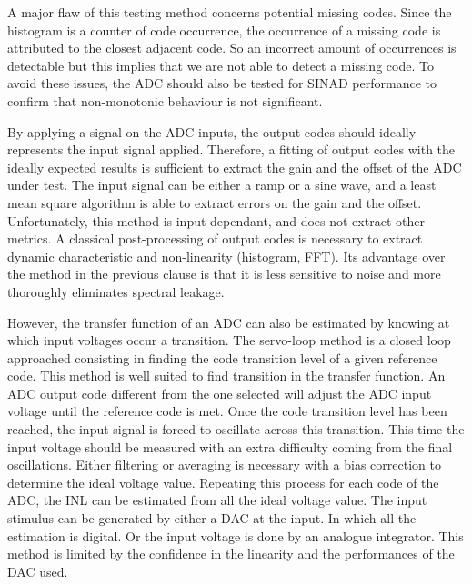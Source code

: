 A major flaw of this testing method concerns potential missing codes. Since the histogram is a counter of code occurrence, the occurrence of a missing code is attributed to the closest adjacent code. So an incorrect amount of occurrences is detectable but this implies that we are not able to detect a missing code. To avoid these issues, the ADC should also be tested for SINAD performance to confirm that non-monotonic behaviour is not significant.

By applying a signal on the ADC inputs, the output codes should ideally represents the input signal applied. Therefore, a fitting of output codes with the ideally expected results is sufficient to extract the gain and the offset of the ADC under test. The input signal can be either a ramp or a sine wave, and a least mean square algorithm is able to extract errors on the gain and the offset.
Unfortunately, this method is input dependant, and does not extract other metrics. A classical post-processing of output codes is necessary to extract dynamic characteristic and non-linearity (histogram, FFT). Its advantage over the method in the previous clause is that it is less sensitive to noise and more thoroughly eliminates spectral leakage.

However, the transfer function of an ADC can also be estimated by knowing at which input voltages occur a transition. The servo-loop method is a closed loop approached consisting in finding the code transition level of a given reference code. This method is well suited to find transition in the transfer function.
An ADC output code different from the one selected will adjust the ADC input voltage until the reference code is met. Once the code transition level has been reached, the input signal is forced to oscillate across this transition.
This time the input voltage should be measured with an extra difficulty coming from the final oscillations. Either filtering or averaging is necessary with a bias correction to determine the ideal voltage value. Repeating this process for each code of the ADC, the INL can be estimated from all the ideal voltage value.
The input stimulus can be generated by either a DAC at the input. In which all the estimation is digital. Or the input voltage is done by an analogue integrator. This method is limited by the confidence in the linearity and the performances of the DAC used.

